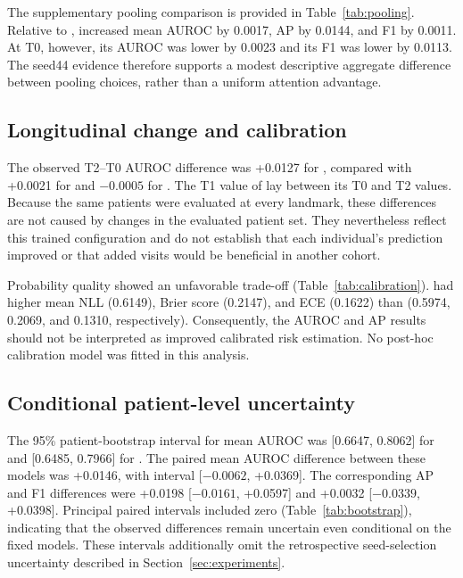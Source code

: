 The supplementary pooling comparison is provided in Table~\ref{tab:pooling}. Relative to \meanmodel{}, \fullmodel{} increased mean AUROC by 0.0017, AP by 0.0144, and F1 by 0.0011. At T0, however, its AUROC was lower by 0.0023 and its F1 was lower by 0.0113. The seed44 evidence therefore supports a modest descriptive aggregate difference between pooling choices, rather than a uniform attention advantage.

\subsection{Longitudinal change and calibration}
The observed T2--T0 AUROC difference was +0.0127 for \fullmodel{}, compared with +0.0021 for \nojepa{} and $-0.0005$ for \direct{}. The T1 value of \fullmodel{} lay between its T0 and T2 values. Because the same patients were evaluated at every landmark, these differences are not caused by changes in the evaluated patient set. They nevertheless reflect this trained configuration and do not establish that each individual's prediction improved or that added visits would be beneficial in another cohort.

Probability quality showed an unfavorable trade-off (Table~\ref{tab:calibration}). \fullmodel{} had higher mean NLL (0.6149), Brier score (0.2147), and ECE (0.1622) than \nojepa{} (0.5974, 0.2069, and 0.1310, respectively). Consequently, the AUROC and AP results should not be interpreted as improved calibrated risk estimation. No post-hoc calibration model was fitted in this analysis.


\subsection{Conditional patient-level uncertainty}
The 95\% patient-bootstrap interval for mean AUROC was [0.6647, 0.8062] for \fullmodel{} and [0.6485, 0.7966] for \nojepa{}. The paired mean AUROC difference between these models was +0.0146, with interval [$-0.0062$, +0.0369]. The corresponding AP and F1 differences were +0.0198 [$-0.0161$, +0.0597] and +0.0032 [$-0.0339$, +0.0398]. Principal paired intervals included zero (Table~\ref{tab:bootstrap}), indicating that the observed differences remain uncertain even conditional on the fixed models. These intervals additionally omit the retrospective seed-selection uncertainty described in Section~\ref{sec:experiments}.
